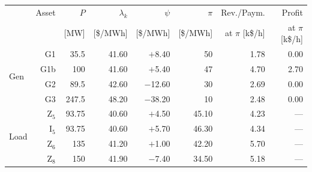 \begin{table}[!tb]
\centering
\label{tab:colocated_bus1_9bus}
\footnotesize
\setlength{\tabcolsep}{2pt}
\newcommand{\rowhl}[1]{\cellcolor{gray!25}#1}
\begin{tabular}{lrrrrrrr}
\toprule
 & Asset & $P$ & $\lambda_k$ & $\psi$ & $\pi$ & Rev./Paym. & Profit \\
 &  & [MW] & [\$/MWh] & [\$/MWh] & [\$/MWh] & at $\pi$ [k\$/h] & at $\pi$ [k\$/h] \\
\midrule
\multirow{4}{*}{Gen} & \rowhl{G1} & \rowhl{35.5} & \rowhl{41.60} & \rowhl{$+$8.40} & \rowhl{50} & \rowhl{1.78} & \rowhl{0.00} \\
 & \rowhl{G1b} & \rowhl{100} & \rowhl{41.60} & \rowhl{$+$5.40} & \rowhl{47} & \rowhl{4.70} & \rowhl{2.70} \\
 & G2 & 89.5 & 42.60 & $-$12.60 & 30 & 2.69 & 0.00 \\
 & G3 & 247.5 & 48.20 & $-$38.20 & 10 & 2.48 & 0.00 \\
\midrule
\multirow{4}{*}{Load} & \rowhl{Z$_5$} & \rowhl{93.75} & \rowhl{40.60} & \rowhl{$+$4.50} & \rowhl{45.10} & \rowhl{4.23} & \rowhl{---} \\
 & \rowhl{I$_5$} & \rowhl{93.75} & \rowhl{40.60} & \rowhl{$+$5.70} & \rowhl{46.30} & \rowhl{4.34} & \rowhl{---} \\
 & Z$_6$ & 135 & 41.20 & $+$1.00 & 42.20 & 5.70 & --- \\
 & Z$_8$ & 150 & 41.90 & $-$7.40 & 34.50 & 5.18 & --- \\
\bottomrule
\end{tabular}
\end{table}
